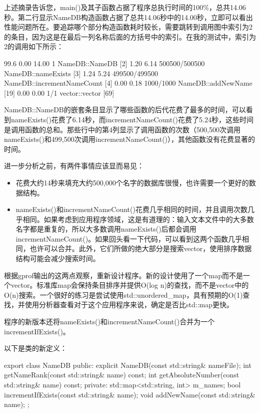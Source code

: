 上述摘录告诉您，main()及其子函数占据了程序总执行时间的100\%，总共14.06秒。第二行显示NameDB构造函数占据了总共14.06秒中的14.00秒，立即可以看出性能问题所在。要追踪哪个部分构造函数耗时较长，需要跳转到调用图中索引为2的条目，因为这是在最后一列名称后面的方括号中的索引。在我的测试中，索引为2的调用如下所示：

\begin{shell}
[2] 99.6   0.00   14.00         1            NameDB::NameDB [2]
           1.20    6.14    500500/500500         NameDB::nameExists [3]
           1.24    5.24    499500/499500         NameDB::incrementNameCount [4]
           0.00    0.18      1000/1000           NameDB::addNewName [19]
           0.00    0.00         1/1              vector::vector [69]
\end{shell}

NameDB::NameDB的嵌套条目显示了哪些函数的后代花费了最多的时间，可以看到nameExists()花费了6.14秒，而incrementNameCount()花费了5.24秒，这些时间是调用函数的总和。那些行中的第4列显示了调用函数的次数（500,500次调用nameExists()和499,500次调用incrementNameCount()），其他函数没有花费显著的时间。

进一步分析之前，有两件事情应该显而易见：

\begin{itemize}
\item
花费大约14秒来填充大约500,000个名字的数据库很慢，也许需要一个更好的数据结构。

\item
nameExists()和incrementNameCount()花费几乎相同的时间，并且调用次数几乎相同。如果考虑到应用程序领域，这是有道理的：输入文本文件中的大多数名字都是重复的，所以大多数调用nameExists()后都会调用incrementNameCount()。如果回头看一下代码，可以看到这两个函数几乎相同，也许可以合并。此外，它们所做的绝大部分是搜索vector，使用排序数据结构可能会减少搜索时间。
\end{itemize}


根据gprof输出的这两点观察，重新设计程序。新的设计使用了一个map而不是一个vector。标准库map会保持条目排序并提供O(log n)的查找，而不是vector中的O(n)搜索。一个很好的练习是尝试使用std::unordered\_map，具有预期的O(1)查找，并使用分析器查看对于这个应用程序来说，确定是否比std::map更快。

程序的新版本还将nameExists()和incrementNameCount()合并为一个incrementIfExists()。

以下是类的新定义：

\begin{cpp}
export class NameDB
{
    public:
        explicit NameDB(const std::string& nameFile);
        int getNameRank(const std::string& name) const;
        int getAbsoluteNumber(const std::string& name) const;
    private:
        std::map<std::string, int> m_names;
        bool incrementIfExists(const std::string& name);
        void addNewName(const std::string& name);
};
\end{cpp}


